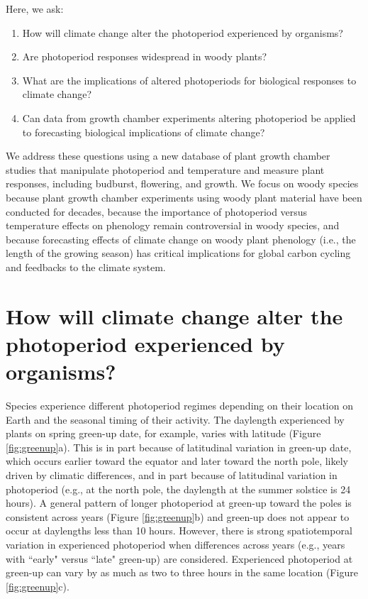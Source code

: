 \documentclass{article}
\begin{document}
\par Here, we ask: 
\begin{enumerate}
\item How will climate change alter the photoperiod experienced by organisms?
\item Are photoperiod responses widespread in woody plants?
\item What are the implications of altered photoperiods for biological responses to climate change?
\item Can data from growth chamber experiments altering photoperiod be applied to forecasting biological implications of climate change?

\end{enumerate}
\par We address these questions using a new database of plant growth chamber studies that manipulate photoperiod and temperature and measure plant responses, including budburst, flowering, and growth.  %
We focus on woody species because plant growth chamber experiments using woody plant material have been conducted for decades, because the importance of photoperiod versus temperature effects on phenology remain controversial in woody species, and because forecasting effects of climate change on woody plant phenology (i.e., the length of the growing season) has critical implications for global carbon cycling and feedbacks to the climate system. 

\section*{How will climate change alter the photoperiod experienced by organisms?}
\par Species experience different photoperiod regimes depending on their location on Earth and the seasonal timing of their activity. The daylength experienced by plants on spring green-up date, for example, varies with latitude (Figure \ref{fig:greenup}a). This is in part because of latitudinal variation in green-up date, which occurs earlier toward the equator and later toward the north pole, likely driven by climatic differences, and in part because of latitudinal variation in photoperiod (e.g., at the north pole, the daylength at the summer solstice is 24 hours). A general pattern of longer photoperiod at green-up toward the poles is consistent across years (Figure \ref{fig:greenup}b) and green-up does not appear to occur at daylengths less than 10 hours. However, there is strong spatiotemporal variation in experienced photoperiod when differences across years (e.g., years with ``early" versus ``late" green-up) are considered. Experienced photoperiod at green-up can vary by as much as two to three hours in the same location (Figure \ref{fig:greenup}c).
\end{document}
